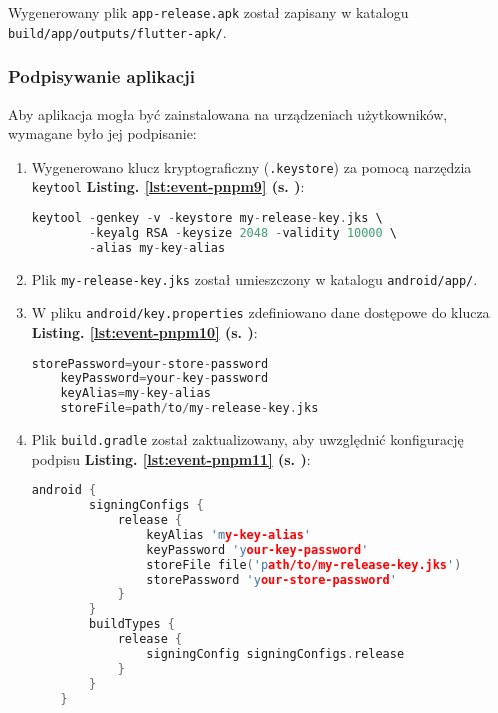 Wygenerowany plik \texttt{app-release.apk} został zapisany w katalogu \texttt{build/app/outputs/flutter-apk/}.

\subsubsection{Podpisywanie aplikacji}

Aby aplikacja mogła być zainstalowana na urządzeniach użytkowników, wymagane było jej podpisanie:
\begin{enumerate}
  \item Wygenerowano klucz kryptograficzny (\texttt{.keystore}) za pomocą narzędzia \texttt{keytool} \textbf{Listing. \ref{lst:event-pnpm9} (s. \pageref{lst:event-pnpm9})}:
        \begin{lstlisting}[language=C++, caption=Generowanie kluczu krypotraficznego,  label={lst:event-pnpm9}]
    keytool -genkey -v -keystore my-release-key.jks \
        -keyalg RSA -keysize 2048 -validity 10000 \
        -alias my-key-alias
    \end{lstlisting}
  \item Plik \texttt{my-release-key.jks} został umieszczony w katalogu \texttt{android/app/}.
  \item W pliku \texttt{android/key.properties} zdefiniowano dane dostępowe do klucza \textbf{Listing. \ref{lst:event-pnpm10} (s. \pageref{lst:event-pnpm10})}:
        \begin{lstlisting}[language=C++, caption=Dane dostępowe do klucza,  label={lst:event-pnpm10}]
    storePassword=your-store-password
    keyPassword=your-key-password
    keyAlias=my-key-alias
    storeFile=path/to/my-release-key.jks
    \end{lstlisting}
  \item Plik \texttt{build.gradle} został zaktualizowany, aby uwzględnić konfigurację podpisu \textbf{Listing. \ref{lst:event-pnpm11} (s. \pageref{lst:event-pnpm11})}:
        \begin{lstlisting}[language=C++, caption=Uwzględnienie podpisu w pliku build.gradle,  label={lst:event-pnpm11}]
    android {
        signingConfigs {
            release {
                keyAlias 'my-key-alias'
                keyPassword 'your-key-password'
                storeFile file('path/to/my-release-key.jks')
                storePassword 'your-store-password'
            }
        }
        buildTypes {
            release {
                signingConfig signingConfigs.release
            }
        }
    }
    \end{lstlisting}
\end{enumerate}

